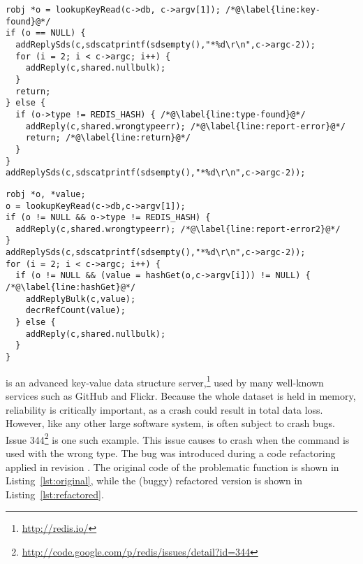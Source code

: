 
\begin{figure*}[t]
\begin{minipage}[b]{0.90\columnwidth}
\begin{lstlisting}[label=lst:original, caption={Original (correct) version of the {\footnotesize \texttt{hmgetCommand}} function in \redis.}]
robj *o = lookupKeyRead(c->db, c->argv[1]); /*@\label{line:key-found}@*/
if (o == NULL) {
  addReplySds(c,sdscatprintf(sdsempty(),"*%d\r\n",c->argc-2));
  for (i = 2; i < c->argc; i++) {
    addReply(c,shared.nullbulk);
  }
  return;
} else {
  if (o->type != REDIS_HASH) { /*@\label{line:type-found}@*/
    addReply(c,shared.wrongtypeerr); /*@\label{line:report-error}@*/
    return; /*@\label{line:return}@*/
  }
}
addReplySds(c,sdscatprintf(sdsempty(),"*%d\r\n",c->argc-2));
\end{lstlisting}
\end{minipage}
\hspace{2.2\columnsep}
\begin{minipage}[b]{0.9\columnwidth}
\begin{lstlisting}[label=lst:refactored, caption={Refactored (buggy) version of the {\footnotesize \texttt{hmgetCommand}} function in \redis.}]
robj *o, *value;
o = lookupKeyRead(c->db,c->argv[1]);
if (o != NULL && o->type != REDIS_HASH) {
  addReply(c,shared.wrongtypeerr); /*@\label{line:report-error2}@*/
}
addReplySds(c,sdscatprintf(sdsempty(),"*%d\r\n",c->argc-2));
for (i = 2; i < c->argc; i++) {
  if (o != NULL && (value = hashGet(o,c->argv[i])) != NULL) { /*@\label{line:hashGet}@*/
    addReplyBulk(c,value);
    decrRefCount(value);
  } else {
    addReply(c,shared.nullbulk);
  }
}
\end{lstlisting}
\end{minipage}
\end{figure*}



\redis is an advanced key-value data structure
server,\footnote{\url{http://redis.io/}} 
used by many well-known services such as GitHub and Flickr.
%
Because the whole dataset is held in memory, reliability is critically
important, as a crash could result in total data loss.  However, like
any other large software system, \redis is often subject to crash
bugs.  Issue
344\footnote{\url{http://code.google.com/p/redis/issues/detail?id=344}}
is one such example.  This issue causes \redis to crash when the
 command is used with the wrong type.  The bug was
introduced during a code refactoring applied in revision
.  The original code of the problematic
 function is shown in
Listing~\ref{lst:original}, while the (buggy) refactored version is
shown in Listing~\ref{lst:refactored}. 

